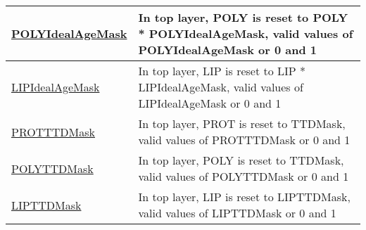 {\begin{center}
\begin{longtable}{| p{2.0in} | p{4.0in} |}
    \hline
    \hyperref[subsec:var_sec_forcing_POLYIdealAgeMask]{POLYIdealAgeMask} & In top layer, POLY is reset to POLY * POLYIdealAgeMask, valid values of POLYIdealAgeMask or 0 and 1 \\
    \hline
    \hyperref[subsec:var_sec_forcing_LIPIdealAgeMask]{LIPIdealAgeMask} & In top layer, LIP is reset to LIP * LIPIdealAgeMask, valid values of LIPIdealAgeMask or 0 and 1 \\
    \hline
    \hyperref[subsec:var_sec_forcing_PROTTTDMask]{PROTTTDMask} & In top layer, PROT is reset to TTDMask, valid values of PROTTTDMask or 0 and 1 \\
    \hline
    \hyperref[subsec:var_sec_forcing_POLYTTDMask]{POLYTTDMask} & In top layer, POLY is reset to TTDMask, valid values of POLYTTDMask or 0 and 1 \\
    \hline
    \hyperref[subsec:var_sec_forcing_LIPTTDMask]{LIPTTDMask} & In top layer, LIP is reset to LIPTTDMask, valid values of LIPTTDMask or 0 and 1 \\
    \hline
\end{longtable}
\end{center}
}

